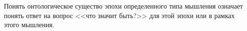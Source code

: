 Понять онтологическое существо эпохи определенного типа мышления означает понять ответ
на вопрос <<что значит быть?>> для этой эпохи или в рамках этого мышления. 
